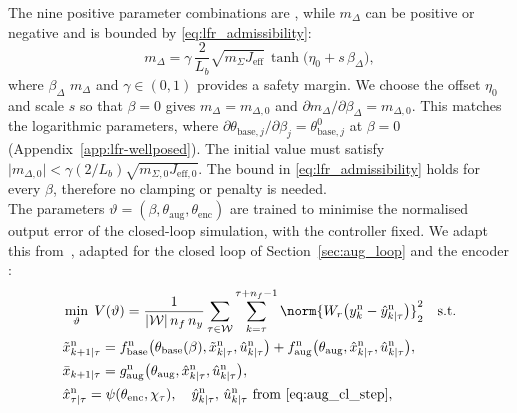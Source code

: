 The nine positive parameter combinations are
,
while $m_\Delta$ can be positive or negative and is bounded
by \eqref{eq:lfr_admissibility}:
\begin{equation}
  m_\Delta=\gamma\,\frac{2}{L_b}\sqrt{m_\Sigma J_{\mathrm{eff}}}\,
  \tanh\bigl(\eta_0+s\,\beta_\Delta\bigr),
  \label{eq:mdelta_map}
\end{equation}
where $\beta_\Delta$  $m_\Delta$ and
$\gamma\in(0,1)$ provides a safety margin.
We choose the offset $\eta_0$ and scale $s$ so that
$\beta=0$ gives $m_\Delta=m_{\Delta,0}$ and
$\partial m_\Delta/\partial\beta_\Delta=m_{\Delta,0}$.
This matches the logarithmic parameters, where
$\partial\theta_{\mathrm{base},j}/\partial\beta_j
=\theta^0_{\mathrm{base},j}$ at $\beta=0$
(Appendix~\ref{app:lfr-wellposed}).
The initial value must satisfy
$\lvert m_{\Delta,0}\rvert<\gamma(2/L_b)\sqrt{m_{\Sigma,0}J_{\mathrm{eff},0}}$.
The bound in \eqref{eq:lfr_admissibility} holds for
every $\beta$, therefore no clamping or penalty is needed.
\\
The parameters
$\vartheta=(\beta,\theta_{\mathrm{aug}},\theta_{\mathrm{enc}})$
are trained to minimise the normalised output error of the
closed-loop simulation, with the
controller fixed. We adapt this from~\cite[Eq.~(22)]{hoekstra2026lfr}, 
adapted for the closed loop of Section~\ref{sec:aug_loop} and the
encoder :
\begin{equation}
\begin{aligned}
 &\min_{\vartheta}\;V(\vartheta)=\frac{1}{|\mathcal W|\,n_f\,n_y}
 \sum_{\tau\in\mathcal W}\sum_{k=\tau}^{\tau+n_f-1}
 \norm{W_r\bigl(y^{\mathrm n}_{k}-\hat y^{\mathrm n}_{k|\tau}\bigr)}_2^2\quad\text{s.t.}\\
 &\tilde x^{\mathrm n}_{k+1|\tau}
  =f^{\mathrm n}_{\mathrm{base}}\bigl(\theta_{\mathrm{base}}(\beta),
   \tilde x^{\mathrm n}_{k|\tau},\hat u^{\mathrm n}_{k|\tau}\bigr)
  +f^{\mathrm n}_{\mathrm{aug}}\bigl(\theta_{\mathrm{aug}},
   \hat x^{\mathrm n}_{k|\tau},\hat u^{\mathrm n}_{k|\tau}\bigr),\\
 &\bar x_{k+1|\tau}=g^{\mathrm n}_{\mathrm{aug}}\bigl(\theta_{\mathrm{aug}},
   \hat x^{\mathrm n}_{k|\tau},\hat u^{\mathrm n}_{k|\tau}\bigr),\\
 &\hat x^{\mathrm n}_{\tau|\tau}=\psi(\theta_{\mathrm{enc}},\chi_\tau),\quad
  \hat y^{\mathrm n}_{k|\tau},\,\hat u^{\mathrm n}_{k|\tau}\text{ from \eqref{eq:aug_cl_step}},
\end{aligned}
\label{eq:aug_loss}
\end{equation}
